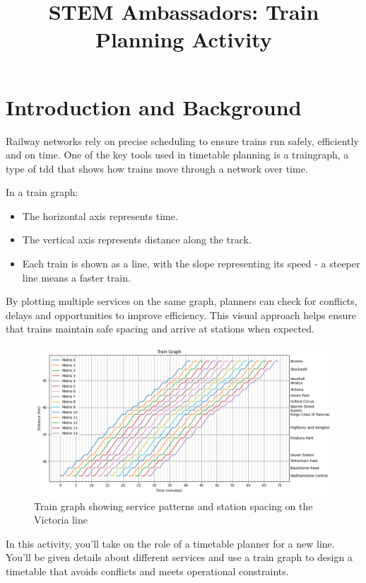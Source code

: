\documentclass[a4paper]{article}
\title{STEM Ambassadors: Train Planning Activity}
\begin{document}
	\maketitle
	
	\section{Introduction and Background}
	
	Railway networks rely on precise scheduling to ensure trains run safely, efficiently and on time. One of the key tools used in timetable planning is a \gls{traingraph}, a type of \gls{tdd} that shows how trains move through a network over time.
	
	In a train graph:
	\begin{itemize}
		\item The horizontal axis represents time.
		\item The vertical axis represents distance along the track.
		\item Each train is shown as a line, with the slope representing its speed - a steeper line means a faster train.
	\end{itemize}
	
	By plotting multiple services on the same graph, planners can check for conflicts, delays and opportunities to improve efficiency. This visual approach helps ensure that trains maintain safe spacing and arrive at stations when expected.
	
	\begin{figure}[h]
		\centering
		\includegraphics[width=\textwidth]{../train-generator/victoria.png}
		\caption{Train graph showing service patterns and station spacing on the Victoria line}
		\label{fig:vic-train-graph}
	\end{figure}
	
	In this activity, you'll take on the role of a timetable planner for a new line. You'll be given details about different services and use a train graph to design a timetable that avoids conflicts and meets operational constraints.
	
\end{document}
